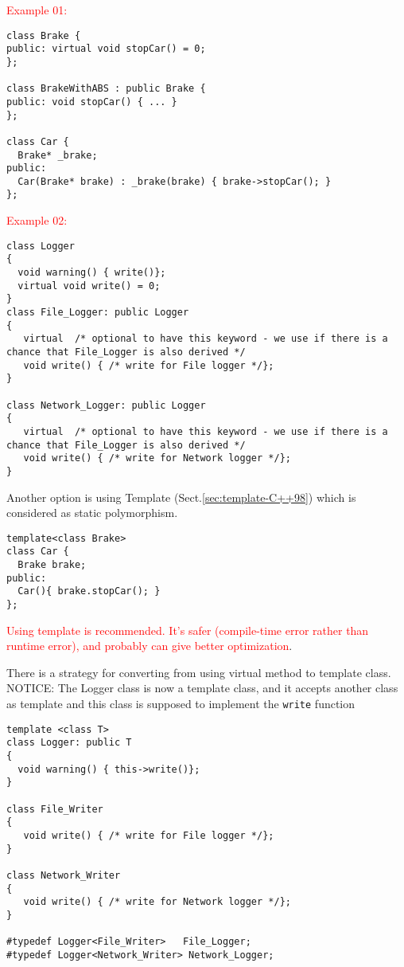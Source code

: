 \textcolor{red}{Example 01:}
{\small \begin{verbatim} 
class Brake {
public: virtual void stopCar() = 0;  
};

class BrakeWithABS : public Brake {
public: void stopCar() { ... }
};

class Car {
  Brake* _brake;
public:
  Car(Brake* brake) : _brake(brake) { brake->stopCar(); }
};
\end{verbatim}
}

\textcolor{red}{Example 02:}
\begin{verbatim}
class Logger
{
  void warning() { write()};
  virtual void write() = 0;
}
class File_Logger: public Logger
{
   virtual  /* optional to have this keyword - we use if there is a chance that File_Logger is also derived */
   void write() { /* write for File logger */};
}

class Network_Logger: public Logger
{
   virtual  /* optional to have this keyword - we use if there is a chance that File_Logger is also derived */
   void write() { /* write for Network logger */};
}
\end{verbatim}


Another option is using Template (Sect.\ref{sec:template-C++98}) which is considered as 
static polymorphism.

\begin{verbatim}
template<class Brake>
class Car {
  Brake brake;
public:
  Car(){ brake.stopCar(); }
};
\end{verbatim}
\textcolor{red}{Using template is recommended. It's safer (compile-time error
rather than runtime error), and probably can give better optimization}. 

There is a strategy for converting from using virtual method to template class.
NOTICE: The Logger class is now a template class, and it accepts another class 
as template and this class is supposed to implement the \verb!write! function
\begin{lstlisting}
template <class T>
class Logger: public T
{
  void warning() { this->write()};
}

class File_Writer
{
   void write() { /* write for File logger */};
}

class Network_Writer
{
   void write() { /* write for Network logger */};
}

#typedef Logger<File_Writer>   File_Logger;
#typedef Logger<Network_Writer> Network_Logger;


\end{lstlisting}

